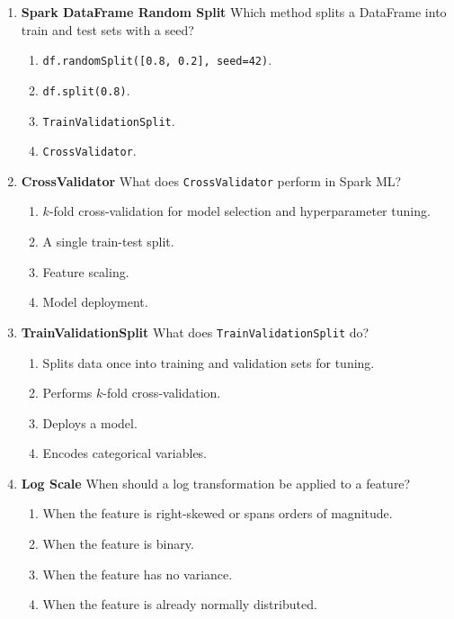 \documentclass{article}
\begin{document}
\begin{enumerate}[label=\textbf{Q\arabic*.}]
		\item \textbf{Spark DataFrame Random Split}
		Which method splits a DataFrame into train and test sets with a seed?
		\begin{enumerate}[label=\Alph*.]
			\item \texttt{df.randomSplit([0.8, 0.2], seed=42)}.
			\item \texttt{df.split(0.8)}.
			\item \texttt{TrainValidationSplit}.
			\item \texttt{CrossValidator}.
		\end{enumerate}
		
		\item \textbf{CrossValidator}
		What does \texttt{CrossValidator} perform in Spark ML?
		\begin{enumerate}[label=\Alph*.]
			\item $k$-fold cross-validation for model selection and hyperparameter tuning.
			\item A single train-test split.
			\item Feature scaling.
			\item Model deployment.
		\end{enumerate}
		
		\item \textbf{TrainValidationSplit}
		What does \texttt{TrainValidationSplit} do?
		\begin{enumerate}[label=\Alph*.]
			\item Splits data once into training and validation sets for tuning.
			\item Performs $k$-fold cross-validation.
			\item Deploys a model.
			\item Encodes categorical variables.
		\end{enumerate}
		
		\item \textbf{Log Scale}
		When should a log transformation be applied to a feature?
		\begin{enumerate}[label=\Alph*.]
			\item When the feature is right-skewed or spans orders of magnitude.
			\item When the feature is binary.
			\item When the feature has no variance.
			\item When the feature is already normally distributed.
		\end{enumerate}
		

\end{enumerate}
\end{document}
